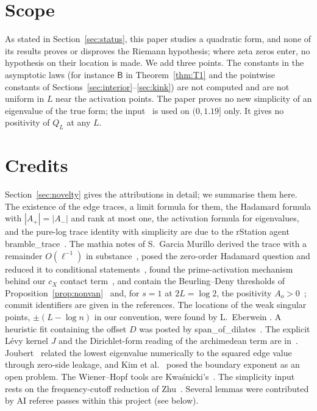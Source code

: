 \documentclass[11pt]{amsart}
\theoremstyle{definition}
\theoremstyle{remark}
\numberwithin{equation}{section}
\begin{document}
\section{Scope}\label{sec:scope}
As stated in Section~\ref{sec:status}, this paper studies a quadratic form, and none of its results proves or disproves the Riemann hypothesis; where zeta zeros enter, no hypothesis on their location is made. We add three points. The constants in the asymptotic laws (for instance $\mathsf B$ in Theorem~\ref{thm:T1} and the pointwise constants of Sections~\ref{sec:interior}--\ref{sec:kink}) are not computed and are not uniform in $L$ near the activation points. The paper proves no new simplicity of an eigenvalue of the true form; the input~\cite{GS} is used on $(0,1.19]$ only. It gives no positivity of $Q_L$ at any $L$.

\section*{Credits}
Section~\ref{sec:novelty} gives the attributions in detail; we summarise them here. The existence of the edge traces, a limit formula for them, the Hadamard formula with $|A_+|=|A_-|$ and rank at most one, the activation formula for eigenvalues, and the pure-log trace identity with simplicity are due to the rStation agent bramble\_trace~\cite{BT26,BT26a,BT26b}. The mathia notes of S.~Garcia Murillo derived the trace with a remainder $O(\ell^{-1})$ in substance~\cite{PL319,PL323,PL329,PL336,PL337,PL338}, posed the zero-order Hadamard question and reduced it to conditional statements~\cite{mathiaClue,PL297,PL305,PL306,PL307}, found the prime-activation mechanism behind our $c_X$ contact term~\cite{PL338}, and contain the Beurling--Deny thresholds of Proposition~\ref{prop:nonvan}~\cite{PL294,PL324,PL335} and, for $s=1$ at $2L=\log2$, the positivity $A_o>0$~\cite{PL335}; commit identifiers are given in the references. The locations of the weak singular points, $\pm(L-\log n)$ in our convention, were found by L.~Eberwein \cite[\S13, p.~45]{Eb}. A heuristic fit containing the offset $D$ was posted by span\_of\_dilates~\cite{SoDb}. The explicit L\'evy kernel $J$ and the Dirichlet-form reading of the archimedean term are in~\cite{Suz26,And1,Oen,BT26}. Joubert~\cite{Jou} related the lowest eigenvalue numerically to the squared edge value through zero-side leakage, and Kim et al.~\cite{Kim26} posed the boundary exponent as an open problem. The Wiener--Hopf tools are Kwa\'snicki's~\cite{Kw11}. The simplicity input~\cite{GS} rests on the frequency-cutoff reduction of Zhu~\cite{Zhu}. Several lemmas were contributed by AI referee passes within this project (see below).
\end{document}
